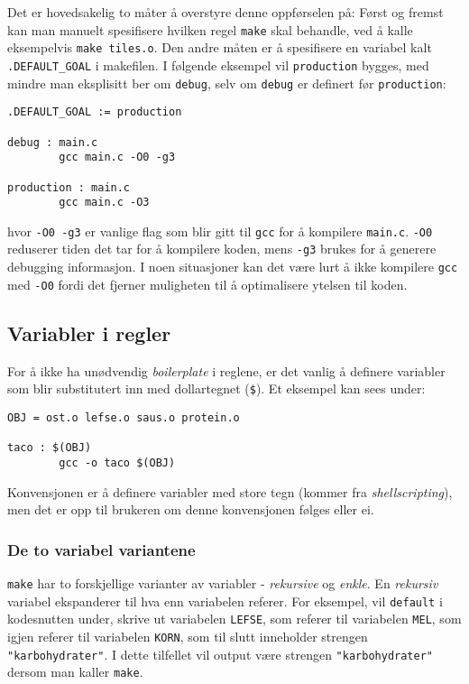 \begin{alphasection}
Det er hovedsakelig to måter å overstyre denne oppførselen på: Først og
fremst kan man manuelt spesifisere hvilken regel \verb|make| skal behandle, ved å
kalle eksempelvis \verb|make tiles.o|. Den andre måten er å spesifisere en variabel kalt \verb|.DEFAULT_GOAL| i makefilen. I følgende eksempel vil \verb|production| bygges, med mindre man eksplisitt ber
om \verb|debug|, selv om \verb|debug| er definert før \verb|production|:

\begin{lstlisting}
.DEFAULT_GOAL := production

debug : main.c
        gcc main.c -O0 -g3

production : main.c
        gcc main.c -O3
\end{lstlisting}

hvor \verb|-O0 -g3| er vanlige flag som blir gitt til \verb|gcc| for å kompilere \verb|main.c|. \verb|-O0| reduserer tiden det tar for å kompilere koden, mens \verb|-g3| brukes for å generere debugging informasjon. I noen situasjoner kan det være lurt å ikke kompilere \verb|gcc| med \verb|-O0| fordi det fjerner muligheten til å optimalisere ytelsen til koden. 

\subsection{Variabler i regler}

For å ikke ha unødvendig \textit{boilerplate} i reglene, er det vanlig å definere variabler som blir substitutert inn med dollartegnet (\verb|$|). Et eksempel kan sees under:

\begin{lstlisting}
OBJ = ost.o lefse.o saus.o protein.o

taco : $(OBJ)
        gcc -o taco $(OBJ)
\end{lstlisting}

Konvensjonen er å definere variabler med store tegn (kommer fra \textit{shellscripting}), men det er opp til brukeren om denne konvensjonen følges eller ei.

\subsubsection{De to variabel variantene}

\verb|make| har to forskjellige varianter av variabler - \textit{rekursive} og \textit{enkle}. En \textit{rekursiv} variabel ekspanderer til hva enn variabelen referer. For eksempel, vil \verb|default| i kodesnutten under, skrive ut variabelen \verb|LEFSE|, som referer til variabelen \verb|MEL|, som igjen referer til variabelen \verb|KORN|, som til slutt inneholder strengen \verb|"karbohydrater"|. I dette tilfellet vil output være strengen \verb|"karbohydrater"| dersom man kaller \verb|make|.


\end{alphasection}
